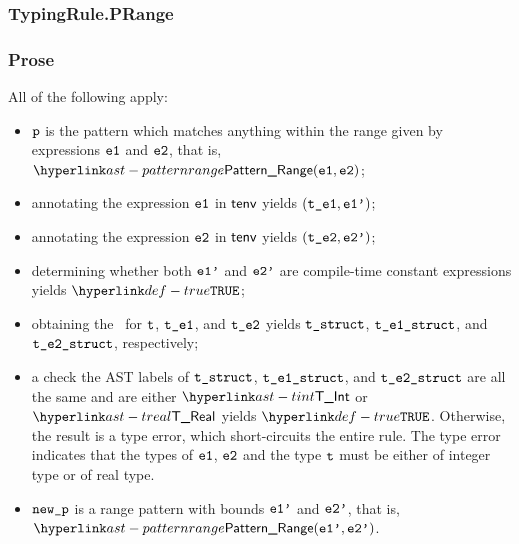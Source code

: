 \subsubsection{TypingRule.PRange\label{sec:TypingRule.PRange}}
\subsubsection{Prose}
All of the following apply:
\begin{itemize}
  \item $\texttt{p}$ is the pattern which matches anything within the range given by
  expressions $\texttt{e1}$ and $\texttt{e2}$, that is, $\PatternRange(\veone, \vetwo)$;
  \item annotating the expression $\texttt{e1}$ in $\textsf{tenv}$ yields $(\texttt{t\_e1}, \texttt{e1'})$\ProseOrTypeError;
  \item annotating the expression $\texttt{e2}$ in $\textsf{tenv}$ yields $(\texttt{t\_e2}, \texttt{e2'})$\ProseOrTypeError;
  \item determining whether both $\texttt{e1'}$ and $\texttt{e2'}$ are compile-time constant expressions yields $\True$\ProseOrTypeError;
  \item obtaining the \underlyingtype\ for $\texttt{t}$, $\texttt{t\_e1}$, and $\texttt{t\_e2}$ yields
        $\texttt{t\_struct}$, $\texttt{t\_e1\_struct}$, and $\texttt{t\_e2\_struct}$, respectively\ProseOrTypeError;
  \item a check the AST labels of $\texttt{t\_struct}$, $\texttt{t\_e1\_struct}$, and $\texttt{t\_e2\_struct}$ are all the same and are either
        $\TInt$ or $\TReal$ yields $\True$. Otherwise, the result is a type error, which short-circuits the entire rule.
        The type error indicates that the types of
        $\texttt{e1}$, $\texttt{e2}$ and the type $\texttt{t}$ must be either of integer type or of real type.
  \item $\texttt{new\_p}$ is a range pattern with bounds $\texttt{e1'}$ and $\texttt{e2'}$, that is, $\PatternRange(\veonep, \vetwop)$.
\end{itemize}
